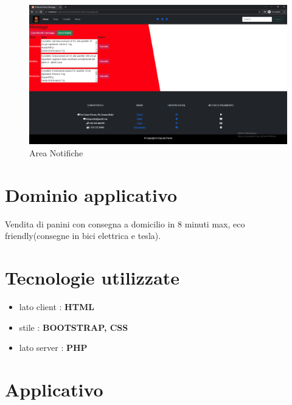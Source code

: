 \documentclass[a4paper,12pt]{report}
\begin{document}
	\begin{figure}[H] 
		\centering
		\includegraphics[width=1.2\textwidth, height=1.2\textheight, keepaspectratio]{./Images/Admin_area_notifiche.png}
		\caption{Area Notifiche}
		\label{fig:notifiche}
	\end{figure}
	
	
	\newpage
	
	\section{Dominio applicativo}
	Vendita di panini con consegna a domicilio in 8 minuti max, eco friendly(consegne in bici elettrica e tesla).
	
	\section{Tecnologie utilizzate}
	\begin{itemize}
		\item lato client : \textbf{HTML}
		\item stile : \textbf{BOOTSTRAP, CSS}
		\item lato server : \textbf{PHP}
	\end{itemize}

	\section{Applicativo}
	
\end{document}
